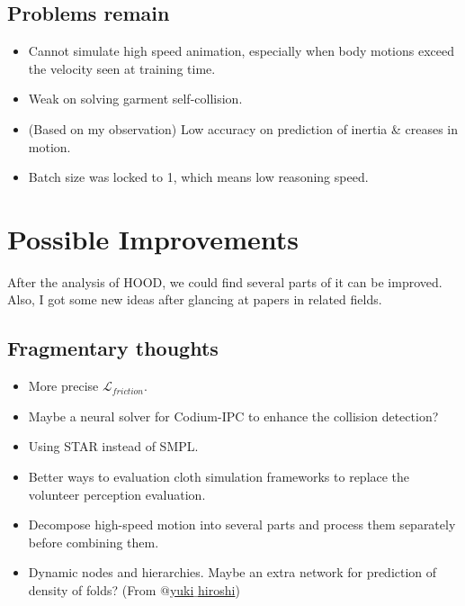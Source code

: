 \documentclass{article}
\begin{document}
\subsection{Problems remain}
\begin{itemize}
    \item Cannot simulate high speed animation, especially when body motions exceed the velocity seen at training time.
    \item Weak on solving garment self-collision.
    \item (Based on my observation) Low accuracy on prediction of inertia \& creases in motion.
    \item Batch size was locked to 1, which means low reasoning speed.
\end{itemize}

\section{Possible Improvements}
\par After the analysis of HOOD, we could find several parts of it can be improved. Also, I got some new ideas after glancing at papers in related fields.
\subsection{Fragmentary thoughts}
\begin{itemize}
    \item More precise $\mathcal{L}_{friction}$.
    \item Maybe a neural solver for Codium-IPC\cite{li2020codimensional} to enhance the collision detection?
    \item Using STAR\cite{STAR:2020} instead of SMPL\cite{SMPL:2015}.
    \item Better ways to evaluation cloth simulation frameworks to replace the volunteer perception evaluation.
    \item Decompose high-speed motion into several parts and process them separately before combining them.
    \item Dynamic nodes and hierarchies. Maybe an extra network for prediction of density of folds? (From \href{https://github.com/Zhaiyuqing2003}{$@$yuki$\_$hiroshi})
\end{itemize}
\end{document}
